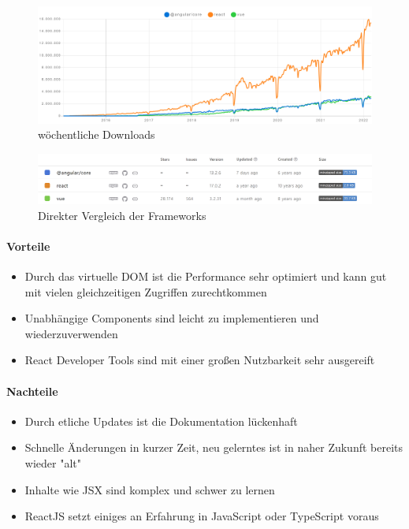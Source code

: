 \begin{figure}[hbt!]
    \centering
    \includegraphics[scale=0.15]{pics/angular-react-vue-npm-chart}
    \caption{wöchentliche Downloads~\cite{angular-react-vue-stats}}
    \label{fig:angular-react-vue-chart}
\end{figure}
\begin{figure}[hbt!]
    \centering
    \includegraphics[scale=0.5]{pics/angular-react-vue-npm-stats}
    \caption{Direkter Vergleich der Frameworks~\cite{angular-react-vue-stats}}
    \label{fig:angular-react-vue-stats}
\end{figure}

\paragraph{Vorteile}
\begin{itemize}
    \item Durch das virtuelle DOM ist die Performance sehr optimiert und kann gut mit vielen gleichzeitigen Zugriffen zurechtkommen
    \item Unabhängige Components sind leicht zu implementieren und wiederzuverwenden
    \item React Developer Tools sind mit einer großen Nutzbarkeit sehr ausgereift
\end{itemize}

\paragraph{Nachteile}
\begin{itemize}
    \item Durch etliche Updates ist die Dokumentation lückenhaft
    \item Schnelle Änderungen in kurzer Zeit, neu gelerntes ist in naher Zukunft bereits wieder "alt"
    \item Inhalte wie JSX sind komplex und schwer zu lernen
    \item ReactJS setzt einiges an Erfahrung in JavaScript oder TypeScript voraus
\end{itemize}


